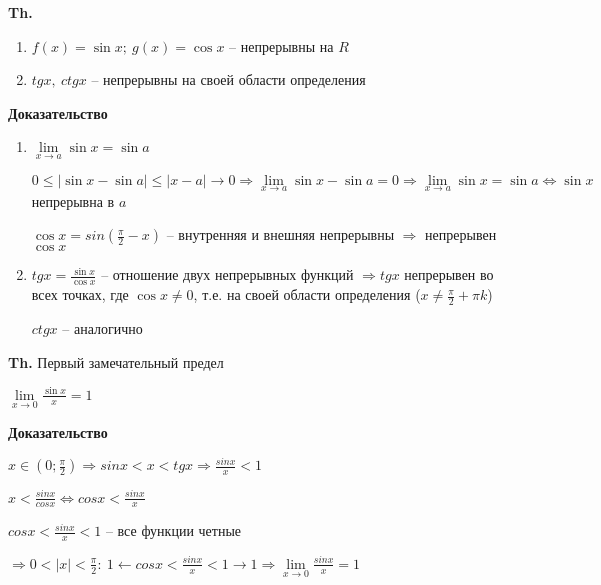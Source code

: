 \documentclass[14pt, letter paper]{article}
\begin{document}
\textbf{Th.}

\begin{enumerate}
    \item $f(x) = \sin{x};\ g(x) = \cos{x}$ -- непрерывны на $R$
    \item $tgx,\ ctgx$ -- непрерывны на своей области определения
\end{enumerate}

\begin{center}
    \textbf{Доказательство}
\end{center}

\begin{enumerate}
    \item $\lim\limits_{x \rightarrow a}{\sin{x}} = \sin{a}$

    $0 \leq |\sin{x} - \sin{a}| \leq |x-a| \rightarrow 0 \Rightarrow \lim\limits_{x \rightarrow a}{\sin{x} - \sin{a}} = 0 \Rightarrow \lim\limits_{x \rightarrow a}{\sin{x}} = \sin{a} \Leftrightarrow \sin{x}$ непрерывна в $a$

    $\cos{x} = sin(\frac{\pi}{2} - x)$ -- внутренняя и внешняя непрерывны $\Rightarrow$ непрерывен $\cos{x}$

    \item $tgx = \frac{\sin{x}}{\cos{x}}$ -- отношение двух непрерывных функций $\Rightarrow tgx$ непрерывен во всех точках, где $\cos{x} \neq 0$, т.е. на своей области определения ($x \neq \frac{\pi}{2} + \pi k$)

    $ctgx$ -- аналогично
\end{enumerate}

\vspace{5mm}

\textbf{Th.} Первый замечательный предел

$\lim\limits_{x \rightarrow 0}{\frac{\sin{x}}{x}} = 1$

\begin{center}
    \textbf{Доказательство}
\end{center}

$x \in (0; \frac{\pi}{2}) \Rightarrow sinx < x < tgx \Rightarrow \frac{sinx}{x} < 1$

$x < \frac{sinx}{cosx} \Leftrightarrow cosx < \frac{sinx}{x}$

$cosx < \frac{sinx}{x} < 1$ -- все функции четные

$\Rightarrow 0 < |x| < \frac{\pi}{2}:\ 1 \leftarrow cosx < \frac{sinx}{x} < 1 \rightarrow 1 \Rightarrow \lim\limits_{x \rightarrow 0}{\frac{sinx}{x}} = 1$

\vspace{5mm}
\end{document}
